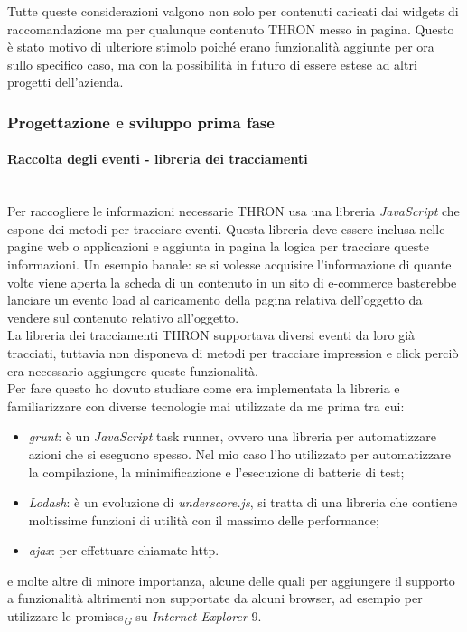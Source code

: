 \documentclass[a4paper, 12pt, twoside, openright]{book}
\newcommand{\gloss}[1]{#1\textsubscript{\textit{\tiny{G}}}}
\begin{document}
Tutte queste considerazioni valgono non solo per contenuti caricati dai widgets di raccomandazione ma per qualunque contenuto THRON messo in pagina. Questo è stato motivo di ulteriore stimolo poiché erano funzionalità aggiunte per ora sullo specifico caso, ma con la possibilità in futuro di essere estese ad altri progetti dell'azienda.

\subsubsection{Progettazione e sviluppo prima fase}

\paragraph{Raccolta degli eventi - libreria dei tracciamenti}\mbox{} \\
Per raccogliere le informazioni necessarie THRON usa una libreria \textit{JavaScript} che espone dei metodi per tracciare eventi. Questa libreria deve essere inclusa nelle pagine web o applicazioni e aggiunta in pagina la logica per tracciare queste informazioni. Un esempio banale: se si volesse acquisire l'informazione di quante volte viene aperta la scheda di un contenuto in un sito di e-commerce basterebbe lanciare un evento load al caricamento della pagina relativa dell'oggetto da vendere sul contenuto relativo all'oggetto.\\

La libreria dei tracciamenti THRON supportava diversi eventi da loro già tracciati, tuttavia non disponeva di metodi per tracciare impression e click perciò era necessario aggiungere queste funzionalità.\\
Per fare questo ho dovuto studiare come era implementata la libreria e familiarizzare con diverse tecnologie mai utilizzate da me prima tra cui:
\begin{itemize}
\item \textit{grunt}: è un \textit{JavaScript} task runner, ovvero una libreria per automatizzare azioni che si eseguono spesso. Nel mio caso l'ho utilizzato per automatizzare la compilazione, la minimificazione e l'esecuzione di batterie di test;
\item \textit{Lodash}: è un evoluzione di \textit{underscore.js}, si tratta di una libreria che contiene moltissime funzioni di utilità con il massimo delle performance;
\item \textit{ajax}: per effettuare chiamate http.
\end{itemize}
e molte altre di minore importanza, alcune delle quali per aggiungere il supporto a funzionalità altrimenti non supportate da alcuni browser, ad esempio per utilizzare le \gloss{promises} su \textit{Internet Explorer} 9.\\
\end{document}
